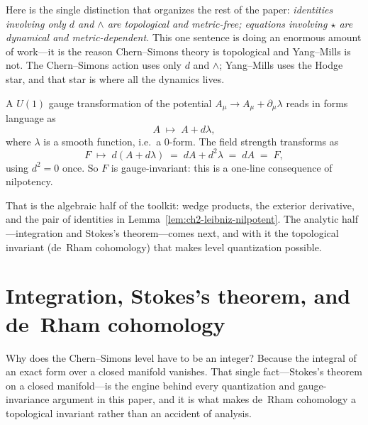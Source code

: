 \begin{example}
\medskip

\noindent Here is the single distinction that organizes the rest of the paper: \emph{identities involving only $d$ and $\wedge$ are topological and metric-free; equations involving $\star$ are dynamical and metric-dependent.}  This one sentence is doing an enormous amount of work---it is the reason Chern--Simons theory is topological and Yang--Mills is not. The Chern--Simons action uses only $d$ and $\wedge$; Yang--Mills uses the Hodge star, and that star is where all the dynamics lives.
\end{example}

\begin{example}\label{ex:gauge-invariance-F}
A $U(1)$ gauge transformation of the potential $A_\mu \to A_\mu + \partial_\mu \lambda$ reads in forms language as
\begin{equation*}
A \;\longmapsto\; A + d\lambda,
\end{equation*}
where $\lambda$ is a smooth function, i.e.\ a $0$-form. The field strength transforms as
\begin{equation*}
F \;\longmapsto\; d(A + d\lambda) \;=\; dA + d^2\lambda \;=\; dA \;=\; F,
\end{equation*}
using $d^2 = 0$ once. So $F$ is gauge-invariant: this is a one-line consequence of nilpotency.
\end{example}

\medskip

\noindent That is the algebraic half of the toolkit: wedge products, the exterior derivative, and the pair of identities in Lemma~\ref{lem:ch2-leibniz-nilpotent}.  The analytic half---integration and Stokes's theorem---comes next, and with it the topological invariant (de~Rham cohomology) that makes level quantization possible.


\section{Integration, Stokes's theorem, and de~Rham cohomology}\label{sec:integration-stokes}

Why does the Chern--Simons level have to be an integer? Because the integral of an exact form over a closed manifold vanishes. That single fact---Stokes's theorem on a closed manifold---is the engine behind every quantization and gauge-invariance argument in this paper, and it is what makes de~Rham cohomology a topological invariant rather than an accident of analysis.

